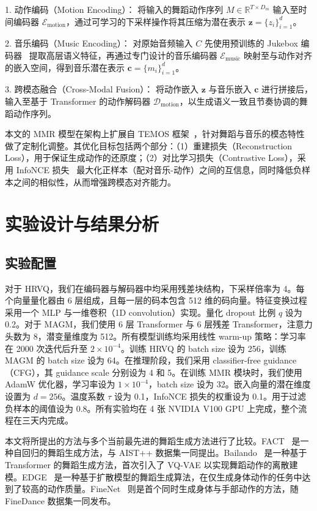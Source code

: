 1. 动作编码（Motion Encoding）：  
   将输入的舞蹈动作序列 $M \in \mathbb{R}^{T \times D_m}$ 输入至时间编码器 $\mathcal{E}_{\text{motion}}$，通过可学习的下采样操作将其压缩为潜在表示 $\mathbf{z} = \{z_i\}_{i=1}^d$。

2. 音乐编码（Music Encoding）：  
   对原始音频输入 $C$ 先使用预训练的 Jukebox 编码器~\cite{dhariwal2020jukebox} 提取高层语义特征，再通过专门设计的音乐编码器 $\mathcal{E}_{\text{music}}$ 映射至与动作对齐的嵌入空间，得到音乐潜在表示 $\mathbf{c} = \{m_i\}_{i=1}^d$。

3. 跨模态融合（Cross-Modal Fusion）：  
   将动作嵌入 $\mathbf{z}$ 与音乐嵌入 $\mathbf{c}$ 进行拼接后，输入至基于 Transformer 的动作解码器 $\mathcal{D}_{\text{motion}}$，以生成语义一致且节奏协调的舞蹈动作序列。

本文的 MMR 模型在架构上扩展自 TEMOS 框架~\cite{petrovich2022temos}，针对舞蹈与音乐的模态特性做了定制化调整。其优化目标包括两个部分：（1）重建损失（Reconstruction Loss），用于保证生成动作的还原度；（2）对比学习损失（Contrastive Loss），采用 InfoNCE 损失~\cite{oord2018representation} 最大化正样本（配对音乐-动作）之间的互信息，同时降低负样本之间的相似性，从而增强跨模态对齐能力。

\section{实验设计与结果分析}

\subsection{实验配置}
对于 HRVQ，我们在编码器与解码器中均采用残差块结构，下采样倍率为 4。每个向量量化器由 6 层组成，且每一层的码本包含 512 维的码向量。特征变换过程采用一个 MLP 与一维卷积（1D convolution）实现。量化 dropout 比例 $q$ 设为 0.2。对于 MAGM，我们使用 6 层 Transformer 与 6 层残差 Transformer，注意力头数为 8，潜变量维度为 512。所有模型训练均采用线性 warm-up 策略：学习率在 2000 次迭代后升至 $2 \times 10^{-4}$。训练 HRVQ 的 batch size 设为 256，训练 MAGM 的 batch size 设为 64。在推理阶段，我们采用 classifier-free guidance（CFG），其 guidance scale 分别设为 4 和 5。在训练 MMR 模块时，我们使用 AdamW 优化器，学习率设为 $1 \times 10^{-4}$，batch size 设为 32。嵌入向量的潜在维度设置为 $d = 256$。温度系数 $\tau$ 设为 0.1，InfoNCE 损失的权重设为 0.1。用于过滤负样本的阈值设为 0.8。所有实验均在 4 张 NVIDIA V100 GPU 上完成，整个流程在三天内完成。

本文将所提出的方法与多个当前最先进的舞蹈生成方法进行了比较。FACT~\cite{li2021ai} 是一种自回归的舞蹈生成方法，与 AIST++ 数据集一同提出。Bailando~\cite{siyao2022bailando} 是一种基于 Transformer 的舞蹈生成方法，首次引入了 VQ-VAE 以实现舞蹈动作的离散建模。EDGE~\cite{tseng2023edge} 是一种基于扩散模型的舞蹈生成算法，在仅生成身体动作的任务中达到了较高的动作质量。FineNet~\cite{li2023finedance} 则是首个同时生成身体与手部动作的方法，随 FineDance 数据集一同发布。


